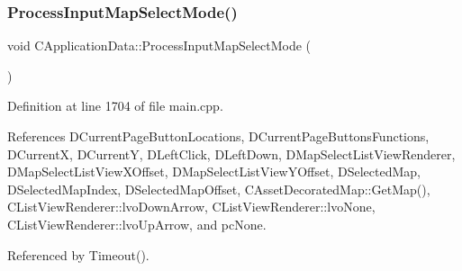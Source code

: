 \subsubsection{\texorpdfstring{Process\+Input\+Map\+Select\+Mode()}{ProcessInputMapSelectMode()}}
{\footnotesize\ttfamily void C\+Application\+Data\+::\+Process\+Input\+Map\+Select\+Mode (\begin{DoxyParamCaption}{ }\end{DoxyParamCaption})\hspace{0.3cm}{\ttfamily [protected]}}



Definition at line 1704 of file main.\+cpp.



References D\+Current\+Page\+Button\+Locations, D\+Current\+Page\+Buttons\+Functions, D\+CurrentX, D\+CurrentY, D\+Left\+Click, D\+Left\+Down, D\+Map\+Select\+List\+View\+Renderer, D\+Map\+Select\+List\+View\+X\+Offset, D\+Map\+Select\+List\+View\+Y\+Offset, D\+Selected\+Map, D\+Selected\+Map\+Index, D\+Selected\+Map\+Offset, C\+Asset\+Decorated\+Map\+::\+Get\+Map(), C\+List\+View\+Renderer\+::lvo\+Down\+Arrow, C\+List\+View\+Renderer\+::lvo\+None, C\+List\+View\+Renderer\+::lvo\+Up\+Arrow, and pc\+None.



Referenced by Timeout().


